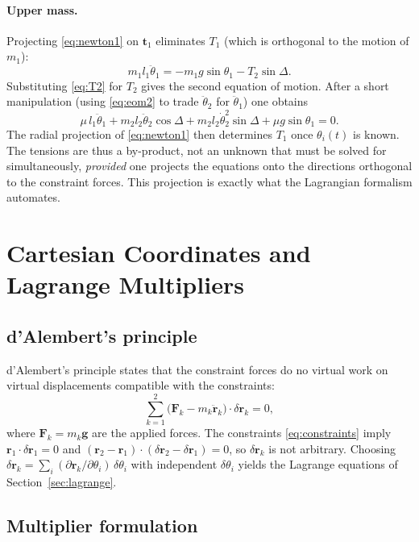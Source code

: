 \documentclass[11pt,a4paper]{book}
\theoremstyle{definition}
\theoremstyle{remark}
\begin{document}
\paragraph{Upper mass.} Projecting \eqref{eq:newton1} on $\bm t_1$ eliminates $T_1$ (which is orthogonal to the
motion of $m_1$):
\begin{equation}
  m_1 l_1\ddot\theta_1 = -m_1 g\sin\theta_1 - T_2\sin\Delta .
  \label{eq:tangent1}
\end{equation}
Substituting \eqref{eq:T2} for $T_2$ gives the second equation of motion. After a short manipulation (using
\eqref{eq:eom2} to trade $\ddot\theta_2$ for $\ddot\theta_1$) one obtains
\begin{equation}
  \mu\, l_1\ddot\theta_1 + m_2 l_2\ddot\theta_2\cos\Delta + m_2 l_2\dot\theta_2^2\sin\Delta + \mu g\sin\theta_1 = 0 .
  \label{eq:eom1}
\end{equation}
The radial projection of \eqref{eq:newton1} then determines $T_1$ once $\theta_i(t)$ is known. The tensions are
thus a by-product, not an unknown that must be solved for simultaneously, \emph{provided} one projects the
equations onto the directions orthogonal to the constraint forces. This projection is exactly what the Lagrangian
formalism automates.

\section{Cartesian Coordinates and Lagrange Multipliers}
\label{sec:cartesian}

\subsection{d'Alembert's principle}

d'Alembert's principle states that the constraint forces do no virtual work on virtual displacements compatible with the
constraints:
\begin{equation}
  \sum_{k=1}^{2}\big(\bm F_k - m_k\ddot{\bm r}_k\big)\cdot\delta\bm r_k = 0 ,
\end{equation}
where $\bm F_k=m_k\bm g$ are the applied forces. The constraints \eqref{eq:constraints} imply
$\bm r_1\cdot\delta\bm r_1=0$ and $(\bm r_2-\bm r_1)\cdot(\delta\bm r_2-\delta\bm r_1)=0$, so $\delta\bm r_k$ is
not arbitrary. Choosing $\delta\bm r_k=\sum_i(\partial\bm r_k/\partial\theta_i)\,\delta\theta_i$ with independent
$\delta\theta_i$ yields the Lagrange equations of Section~\ref{sec:lagrange}.

\subsection{Multiplier formulation}
\end{document}
